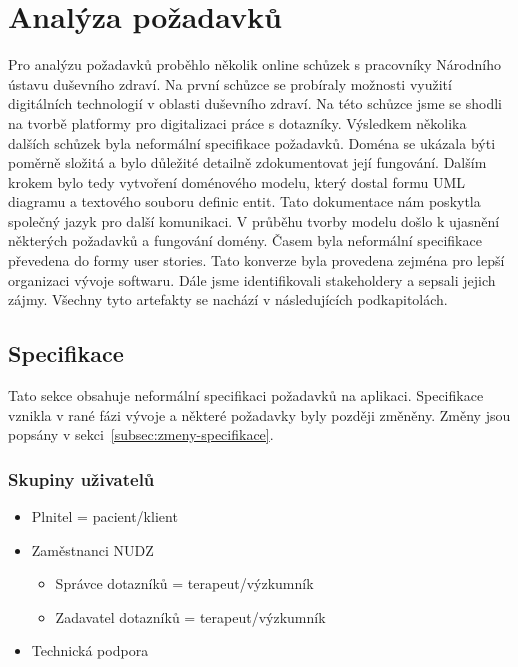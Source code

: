 \chapter{Analýza požadavků}\label{ch:analyza-pozadavku}

Pro analýzu požadavků proběhlo několik online schůzek s pracovníky Národního ústavu duševního zdraví.
Na první schůzce se probíraly možnosti využití digitálních technologií v oblasti duševního zdraví.
Na této schůzce jsme se shodli na tvorbě platformy pro digitalizaci práce s dotazníky.
Výsledkem několika dalších schůzek byla neformální specifikace požadavků.
Doména se ukázala býti poměrně složitá a bylo důležité detailně zdokumentovat její fungování.
Dalším krokem bylo tedy vytvoření doménového modelu, který dostal formu UML diagramu a textového souboru definic entit.
Tato dokumentace nám poskytla společný jazyk pro další komunikaci.
V průběhu tvorby modelu došlo k ujasnění některých požadavků a fungování domény.
Časem byla neformální specifikace převedena do formy user stories.
Tato konverze byla provedena zejména pro lepší organizaci vývoje softwaru.
Dále jsme identifikovali stakeholdery a sepsali jejich zájmy.
Všechny tyto artefakty se nachází v následujících podkapitolách.

\section{Specifikace}\label{sec:specifikace}

Tato sekce obsahuje neformální specifikaci požadavků na aplikaci.
Specifikace vznikla v rané fázi vývoje a některé požadavky byly později změněny.
Změny jsou popsány v sekci~\ref{subsec:zmeny-specifikace}.

\subsection{Skupiny uživatelů}\label{subsec:skupiny-uzivatelu}

\begin{itemize}
\item
Plnitel = pacient/klient

\item
  Zaměstnanci NUDZ

  \begin{itemize}
  \item
    Správce dotazníků = terapeut/výzkumník
  \item
    Zadavatel dotazníků = terapeut/výzkumník
  \end{itemize}
\item
  Technická podpora
\end{itemize}


